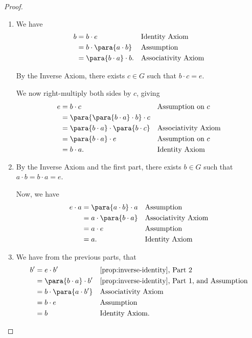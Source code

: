 \begin{proof}
    \begin{enumerate}
        \item We have
        \begin{align*}
            b &= b \cdot e && \text{Identity Axiom} \\
            &= b \cdot \para{a \cdot b} && \text{Assumption} \\
            &= \para{b \cdot a} \cdot b. && \text{Associativity Axiom}
        \end{align*}

        By the Inverse Axiom, there exists \(c \in G\) such that \(b \cdot c = e\).

        We now right-multiply both sides by \(c\), giving
        \begin{align*}
            e &= b \cdot c && \text{Assumption on }c \\
            &= \para{\para{b \cdot a} \cdot b} \cdot c \\
            &= \para{b \cdot a} \cdot \para{b \cdot c} && \text{Associativity Axiom} \\
            &= \para{b \cdot a} \cdot e && \text{Assumption on }c \\
            &= b \cdot a. && \text{Identity Axiom}
        \end{align*}

        \item By the Inverse Axiom and the first part, there exists \(b \in G\) such that \(a \cdot b = b \cdot a = e\).
        
        Now, we have
        \begin{align*}
            e \cdot a &= \para{a \cdot b} \cdot a && \text{Assumption} \\
            &= a \cdot \para{b \cdot a} && \text{Associativity Axiom} \\
            &= a \cdot e && \text{Assumption} \\
            &= a. && \text{Identity Axiom}
        \end{align*}

        \item We have from the previous parts, that
        \begin{align*}
            b' &= e \cdot b' && \text{\autoref{prop:inverse-identity}, Part 2} \\
            &= \para{b \cdot a} \cdot b' && \text{\autoref{prop:inverse-identity}, Part 1, and Assumption} \\
            &= b \cdot \para{a \cdot b'} && \text{Associativity Axiom} \\
            &= b \cdot e && \text{Assumption} \\
            &= b && \text{Identity Axiom}.
        \end{align*}


\end{enumerate}
\end{proof}
